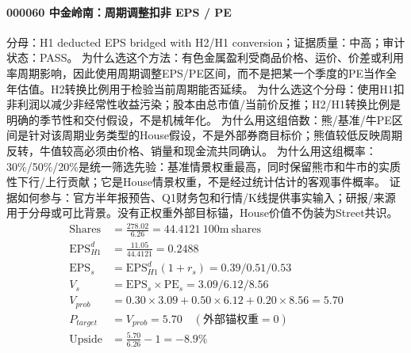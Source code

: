\paragraph{000060 中金岭南：周期调整扣非 EPS / PE}
分母：H1 deducted EPS bridged with H2/H1 conversion；证据质量：中高；审计状态：PASS。
为什么选这个方法：有色金属盈利受商品价格、运价、价差或利用率周期影响，因此使用周期调整EPS/PE区间，而不是把某一个季度的PE当作全年估值。H2转换比例用于检验当前周期能否延续。
为什么选这个分母：使用H1扣非利润以减少非经常性收益污染；股本由总市值/当前价反推；H2/H1转换比例是明确的季节性和交付假设，不是机械年化。
为什么用这组倍数：熊/基准/牛PE区间是针对该周期业务类型的House假设，不是外部券商目标价；熊值较低反映周期反转，牛值较高必须由价格、销量和现金流共同确认。
为什么用这组概率：30\%/50\%/20\%是统一筛选先验：基准情景权重最高，同时保留熊市和牛市的实质性下行/上行贡献；它是House情景权重，不是经过统计估计的客观事件概率。
证据如何参与：官方半年报预告、Q1财务包和行情/K线提供事实输入；研报/来源用于分母或可比背景。没有正权重外部目标锚，House价值不伪装为Street共识。
\begin{align*}
\mathrm{Shares} &= \frac{278.02}{6.26}=44.4121\ \mathrm{100m\ shares}\\
\mathrm{EPS}_{H1}^d &= \frac{11.05}{44.4121}=0.2488\\
\mathrm{EPS}_s &= \mathrm{EPS}_{H1}^d(1+r_s)=0.39/0.51/0.53\\
V_s &= \mathrm{EPS}_s\times \mathrm{PE}_s=3.09/6.12/8.56\\
V_{prob} &= 0.30\times 3.09+0.50\times 6.12+0.20\times 8.56=5.70\\
P_{target} &= V_{prob}=5.70\quad(\text{外部锚权重}=0)\\
\mathrm{Upside} &= \frac{5.70}{6.26}-1=-8.9\%\\
\end{align*}

